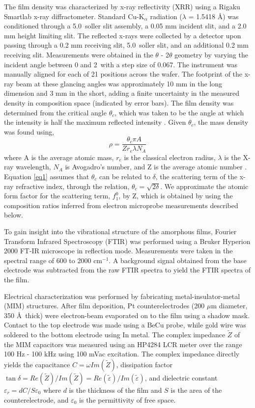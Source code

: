 The film density was characterized by x-ray reflectivity (XRR) using a Rigaku Smartlab x-ray diffractometer. Standard Cu-K$_{\alpha}$ radiation ($\lambda$ = 1.5418 \AA) was conditioned through a 5.0\textdegree \ soller slit assembly, a 0.05 mm incident slit, and a 2.0 mm height limiting slit. The reflected x-rays were collected by a detector upon passing through a 0.2 mm receiving slit, 5.0\textdegree \ soller slit, and an additional 0.2 mm receiving slit. Measurements were obtained in the $\theta$ - 2$\theta$ geometry by varying the incident angle between 0 and 2\textdegree \ with a step size of 0.067\textdegree. The instrument was manually aligned for each of 21 positions across the wafer. The footprint of the x-ray beam at these glancing angles was approximately 10 mm in the long dimension and 3 mm in the short, adding a finite uncertainty in the measured density in composition space (indicated by error bars). The film density was determined from the critical angle $\theta_{c}$, which was taken to be the angle at which the intensity is half the maximum reflected intensity \cite{Parratt1954}. Given $\theta_{c}$, the mass density was found using,
\begin{equation}
\rho = \frac{\theta_{c}\pi A}{Z r_{e} \lambda N_{A}}
\label{eq1}
\end{equation}
where A is the average atomic mass, $r_{e}$ is the classical electron radius, $\lambda$ is the X-ray wavelength, $N_{A}$ is Avogadro’s number, and Z is the average atomic number \cite{Bahr1993}. Equation \ref{eq1} assumes that $\theta_{c}$ can be related to $\delta$, the scattering term of the x-ray refractive index, through the relation, $\theta_{c} = \sqrt{2\delta}$. We approximate the atomic form factor for the scattering term, $f^{0}_{1}$, by Z, which is obtained by using the composition ratios inferred from electron microprobe measurements described below. 

To gain insight into the vibrational structure of the amorphous films, Fourier Transform Infrared Spectroscopy (FTIR) was performed using a Bruker Hyperion 2000 FT-IR microscope in reflection mode. Measurements were taken in the spectral range of 600 to 2000 cm$^{-1}$. A background signal obtained from the base electrode was subtracted from the raw FTIR spectra to yield the FTIR spectra of the film.  

Electrical characterization was performed by fabricating metal-insulator-metal (MIM) structures. After film deposition, Pt counterelectrodes (200 $\mu$m diameter, 350 \AA\ thick) were electron-beam evaporated on to the film using a shadow mask. Contact to the top electrode was made using a BeCu probe, while gold wire was soldered to the bottom electrode using In metal. The complex impedance $\tilde{Z}$ of the MIM capacitors was measured using an HP4284 LCR meter over the range 100 Hz - 100 kHz using 100 mVac excitation. The complex impedance directly yields the capacitance $C=\omega Im(\tilde{Z})$, dissipation factor $\tan\delta = Re(\tilde{Z})/Im(\tilde{Z}) = Re(\tilde{\varepsilon})/Im(\tilde{\varepsilon})$, and dielectric constant $\varepsilon_{r} = d C/S\varepsilon_0$ where $d$ is the thickness of the film and $S$ is the area of the counterelectrode, and $\varepsilon_0$ is the permittivity of free space.

